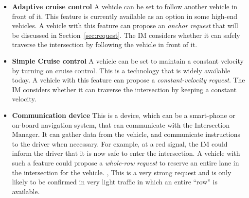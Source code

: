 \begin{itemize}

\item \textbf{Adaptive cruise control} A vehicle can be set to follow
another vehicle in front of it.  This feature is currently available
as an option in some high-end vehicles. A vehicle with this feature
can propose an \textit{anchor request} that will be discussed in
Section~\ref{sec:request}.  The IM considers whether it can safely
traverse the intersection by following the vehicle in front of it.

\item \textbf{Simple Cruise control} A vehicle can be set to maintain
a constant velocity by turning on cruise control. This is a technology
that is widely available today. A vehicle with this feature can
propose a \textit{constant-velocity request}. The IM considers whether
it can traverse the intersection by keeping a constant velocity.

\item \textbf{Communication device} This is a device, which can be a
smart-phone or on-board navigation system, that can communicate with
the Intersection Manager.  It can gather data from the vehicle, and
communicate instructions to the driver when necessary.  For example,
at a red signal, the IM could inform the driver that it is now safe to
enter the intersection.  A vehicle with such a feature could propose a
\textit{whole-row request} to reserve an entire lane in the
intersection for the vehicle.  , This is a very strong request
and is only likely to be confirmed in very light traffic in which an
entire ``row'' is available.


\end{itemize}

